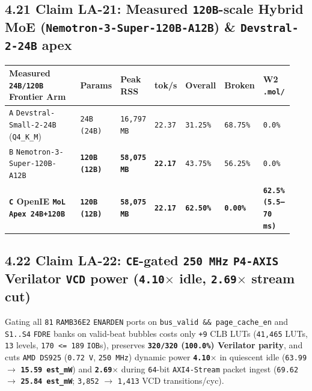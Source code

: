 \documentclass[10pt]{article}
\begin{document}
\subsection{4.21 Claim LA-21: Measured \texttt{120B}-scale Hybrid MoE (\texttt{Nemotron-3-Super-120B-A12B}) \& \texttt{Devstral-2-24B} apex}\label{claim-la21}

{\footnotesize\setlength{\tabcolsep}{2.4pt}
\begin{longtable}{@{}L{0.32\linewidth}C{0.11\linewidth}C{0.12\linewidth}C{0.09\linewidth}C{0.10\linewidth}C{0.09\linewidth}C{0.11\linewidth}@{}}
\toprule
\textbf{Measured \texttt{24B/120B} Frontier Arm} & \textbf{Params} & \textbf{Peak RSS} & \textbf{tok/s} & \textbf{Overall} & \textbf{Broken} & \textbf{W2 \texttt{.mol/}} \\
\midrule
\endhead
\texttt{A} \texttt{Devstral-Small-2-24B} (\texttt{Q4\_K\_M}) & \texttt{24B (24B)} & \texttt{16,797 MB} & \texttt{22.37} & \texttt{31.25\%} & \texttt{68.75\%} & \texttt{0.0\%} \\
\texttt{B} \texttt{Nemotron-3-Super-120B-A12B} & \textbf{\texttt{120B (12B)}} & \textbf{\texttt{58,075 MB}} & \textbf{\texttt{22.17}} & \texttt{43.75\%} & \texttt{56.25\%} & \texttt{0.0\%} \\
\textbf{\texttt{C} OpenIE \texttt{MoL Apex 24B+120B}} & \textbf{\texttt{120B (12B)}} & \textbf{\texttt{58,075 MB}} & \textbf{\texttt{22.17}} & \textbf{\texttt{62.50\%}} & \textbf{\texttt{0.00\%}} & \textbf{\texttt{62.5\% (5.5--70 ms)}} \\
\bottomrule
\end{longtable}
}

\subsection{4.22 Claim LA-22: \texttt{CE}-gated \texttt{250 MHz} \texttt{P4-AXIS} Verilator \texttt{VCD} power (\texttt{4.10\texorpdfstring{$\times$}{x}} idle, \texttt{2.69\texorpdfstring{$\times$}{x}} stream cut)}\label{claim-la22}

Gating all \texttt{81} \texttt{RAMB36E2} \texttt{ENARDEN} ports on \texttt{bus\_valid \&\& page\_cache\_en} and \texttt{S1..S4} \texttt{FDRE} banks on valid-beat bubbles costs only \texttt{+9} CLB LUTs (\texttt{41,465} LUTs, \texttt{13} levels, \texttt{170 <= 189} \texttt{IOB}s), preserves \textbf{\texttt{320/320} (\texttt{100.0\%}) Verilator parity}, and cuts \texttt{AMD DS925} (\texttt{0.72 V}, \texttt{250 MHz}) dynamic power \textbf{\texttt{4.10$\times$}} in quiescent idle (\texttt{63.99} $\to$ \textbf{\texttt{15.59 est\_mW}}) and \textbf{\texttt{2.69$\times$}} during \texttt{64}-bit \texttt{AXI4-Stream} packet ingest (\texttt{69.62} $\to$ \textbf{\texttt{25.84 est\_mW}}; \texttt{3,852} $\to$ \texttt{1,413} VCD transitions/cyc).
\end{document}
